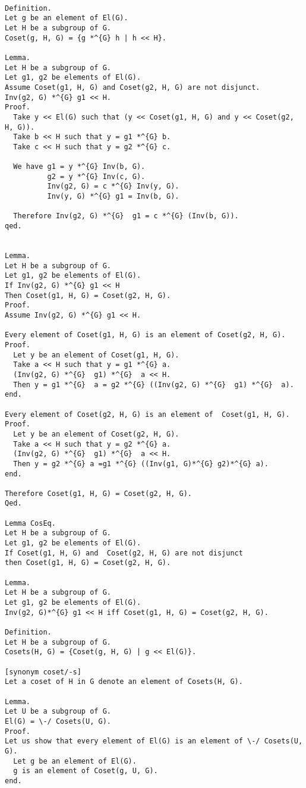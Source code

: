 \documentclass[a4paper,12pt]{scrartcl}
\begin{document}
\begin{lstlisting}

Definition.
Let g be an element of El(G).
Let H be a subgroup of G.
Coset(g, H, G) = {g *^{G} h | h << H}.

Lemma.
Let H be a subgroup of G.
Let g1, g2 be elements of El(G).
Assume Coset(g1, H, G) and Coset(g2, H, G) are not disjunct.
Inv(g2, G) *^{G} g1 << H.
Proof.
  Take y << El(G) such that (y << Coset(g1, H, G) and y << Coset(g2, H, G)).
  Take b << H such that y = g1 *^{G} b.
  Take c << H such that y = g2 *^{G} c.

  We have g1 = y *^{G} Inv(b, G).
          g2 = y *^{G} Inv(c, G).
          Inv(g2, G) = c *^{G} Inv(y, G).
          Inv(y, G) *^{G} g1 = Inv(b, G).

  Therefore Inv(g2, G) *^{G}  g1 = c *^{G} (Inv(b, G)).
qed.


Lemma.
Let H be a subgroup of G.
Let g1, g2 be elements of El(G).
If Inv(g2, G) *^{G} g1 << H
Then Coset(g1, H, G) = Coset(g2, H, G).
Proof.
Assume Inv(g2, G) *^{G} g1 << H.

Every element of Coset(g1, H, G) is an element of Coset(g2, H, G).
Proof.
  Let y be an element of Coset(g1, H, G).
  Take a << H such that y = g1 *^{G} a.
  (Inv(g2, G) *^{G}  g1) *^{G}  a << H.
  Then y = g1 *^{G}  a = g2 *^{G} ((Inv(g2, G) *^{G}  g1) *^{G}  a).
end.

Every element of Coset(g2, H, G) is an element of  Coset(g1, H, G).
Proof.
  Let y be an element of Coset(g2, H, G).
  Take a << H such that y = g2 *^{G} a.
  (Inv(g2, G) *^{G}  g1) *^{G}  a << H.
  Then y = g2 *^{G} a =g1 *^{G} ((Inv(g1, G)*^{G} g2)*^{G} a).
end.

Therefore Coset(g1, H, G) = Coset(g2, H, G).
Qed.

Lemma CosEq.
Let H be a subgroup of G.
Let g1, g2 be elements of El(G).
If Coset(g1, H, G) and  Coset(g2, H, G) are not disjunct
then Coset(g1, H, G) = Coset(g2, H, G).

Lemma.
Let H be a subgroup of G.
Let g1, g2 be elements of El(G).
Inv(g2, G)*^{G} g1 << H iff Coset(g1, H, G) = Coset(g2, H, G).

Definition.
Let H be a subgroup of G.
Cosets(H, G) = {Coset(g, H, G) | g << El(G)}.

[synonym coset/-s]
Let a coset of H in G denote an element of Cosets(H, G).

Lemma.
Let U be a subgroup of G.
El(G) = \-/ Cosets(U, G).
Proof.
Let us show that every element of El(G) is an element of \-/ Cosets(U, G).
  Let g be an element of El(G).
  g is an element of Coset(g, U, G).
end.


\end{lstlisting}
\end{document}
